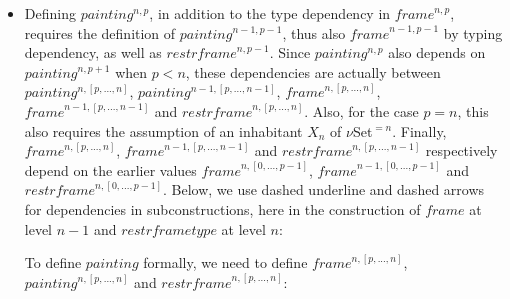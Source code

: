 \documentclass{article}
\newcommand{\myframe}{\mathit{frame}}
\newcommand{\painting}{\mathit{painting}}
\newcommand{\restrframe}{\mathit{restrframe}}
\newcommand{\restrframetype}{\mathit{restrframetype}}
\newcommand{\udensdash}[1]{%
    \tikz[baseline=(todotted.base)]{
        \node[inner sep=1pt,outer sep=0pt] (todotted) {$#1$};
        \draw[densely dashed] (todotted.south west) -- (todotted.south east);
    }%
}%
\begin{document}
\begin{itemize}
  \item Defining $\painting^{n,p}$, in addition to the type dependency
        in $\myframe^{n,p}$, requires the definition of
        $\painting^{n-1,p-1}$, thus also $\myframe^{n-1,p-1}$ by typing
        dependency, as well as $\restrframe^{n,p-1}$. Since
        $\painting^{n,p}$ also depends on $\painting^{n,p+1}$ when $p<n$,
        these dependencies are actually between $\painting^{n,[p,...,n]}$,
        $\painting^{n-1,[p,...,n-1]}$, $\myframe^{n,[p,...,n]}$,
        $\myframe^{n-1,[p,...,n-1]}$ and $\restrframe^{n,[p,...,n]}$. Also,
        for the case $p=n$, this also requires the assumption of an
        inhabitant $X_{n}$ of $\nu$Set$^{=n}$. Finally,
        $\myframe^{n,[p,...,n]}$, $\myframe^{n-1,[p,...,n-1]}$ and
        $\restrframe^{n,[p,...,n-1]}$ respectively depend on the earlier
        values $\myframe^{n,[0,...,p-1]}$, $\myframe^{n-1,[0,...,p-1]}$ and
        $\restrframe^{n,[0,...,p-1]}$.  Below, we use dashed underline and
        dashed arrows for dependencies in subconstructions, here in the
        construction of $\myframe$ at level $n-1$ and $\restrframetype$ at
        level $n$:
        \begin{center}
        \end{center}

To define $\painting$ formally, we need to define $\myframe^{n,[p,...,n]}$, $\painting^{n,[p,...,n]}$ and $\restrframe^{n,[p,...,n]}$:


\end{itemize}
\end{document}
